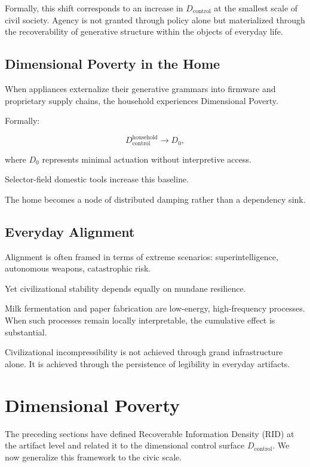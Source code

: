 \documentclass[11pt]{article}
\begin{document}
Formally, this shift corresponds to an increase in
$D_{\text{control}}$ at the smallest scale of civil society. Agency is
not granted through policy alone but materialized through the
recoverability of generative structure within the objects of everyday
life.

\subsection{Dimensional Poverty in the Home}

When appliances externalize their generative grammars into firmware
and proprietary supply chains, the household experiences
Dimensional Poverty.

Formally:

\[
D_{\text{control}}^{\text{household}} \rightarrow D_0,
\]

where $D_0$ represents minimal actuation without interpretive access.

Selector-field domestic tools increase this baseline.

The home becomes a node of distributed damping rather than
a dependency sink.

\subsection{Everyday Alignment}

Alignment is often framed in terms of extreme scenarios:
superintelligence, autonomous weapons, catastrophic risk.

Yet civilizational stability depends equally on mundane resilience.

Milk fermentation and paper fabrication are low-energy,
high-frequency processes. When such processes remain locally
interpretable, the cumulative effect is substantial.

Civilizational incompressibility is not achieved through grand
infrastructure alone. It is achieved through the persistence of
legibility in everyday artifacts.

\section{Dimensional Poverty}

The preceding sections have defined Recoverable Information Density (RID)
at the artifact level and related it to the dimensional control surface
$D_{\text{control}}$. We now generalize this framework to the civic scale.
\end{document}
